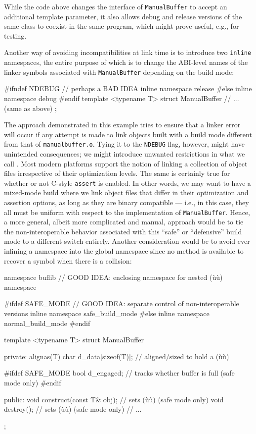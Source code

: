 \noindent While the code above changes the interface of \lstinline!ManualBuffer! to
accept an additional template parameter, it also allows debug and
release versions of the same class to coexist in the same program,
  which might prove useful, e.g., for testing.

Another way of avoiding incompatibilities at link time is to
introduce two \lstinline!inline! namespaces, the entire purpose of which is
to change the ABI-level names of the linker symbols associated with
\lstinline!ManualBuffer! depending on the build mode:

\begin{emcppslisting}
#ifndef NDEBUG            // perhaps a BAD IDEA
inline namespace release
#else
inline namespace debug
#endif
{
    template <typename T>
    struct ManualBuffer
    {
        // ... (same as above)
    };
}
\end{emcppslisting}

\noindent The approach demonstrated in this example tries to ensure that a linker
error will occur if any attempt is made to link objects built with a
build mode different from that of \mbox{\lstinline!manualbuffer.o!}. Tying it to
the \lstinline!NDEBUG! flag, however, might have unintended consequences;
we might introduce unwanted restrictions in what we call
. Most modern platforms support the notion of
linking a collection of object files irrespective of their
optimization levels. The same is certainly true for whether or not
C-style \lstinline!assert! is enabled. In other words, we may want to have
a mixed-mode build where we link object files that differ in their optimization and assertion options, as long as they are binary compatible --- i.e., in this case, they all must be uniform with respect to the implementation of \lstinline!ManualBuffer!.  Hence, a more general, albeit more complicated and
manual, approach would be to tie the non-interoperable behavior
associated with this ``safe'' or ``defensive'' build mode to a different
switch entirely. Another consideration would be to avoid ever inlining a
namespace into the global namespace since no method is available to
recover a symbol when there is a collision:

\begin{emcppslisting}
namespace buflib  // GOOD IDEA: enclosing namespace for nested (ù{}ù) namespace
{
#ifdef SAFE_MODE  // GOOD IDEA: separate control of non-interoperable versions
    inline namespace safe_build_mode
#else
    inline namespace normal_build_mode
#endif
    {
        template <typename T>
        struct ManualBuffer
        {
        private:
            alignas(T) char d_data[sizeof(T)];  // aligned/sized to hold a (ù{}ù)

#ifdef SAFE_MODE
            bool d_engaged;  // tracks whether buffer is full (safe mode only)
#endif

        public:
            void construct(const T& obj);  // sets (ù{}ù) (safe mode only)
            void destroy();                // sets (ù{}ù) (safe mode only)
            // ...
        };
    }
}
\end{emcppslisting}

